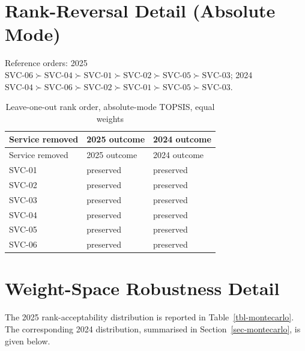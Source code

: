 \documentclass[
  12pt,
  letterpaper,
  12pt,
  oneside,
  english,
  onehalfspacing,
  headsepline]{MastersDoctoralThesis}
\begin{document}
\section{Rank-Reversal Detail (Absolute
Mode)}\label{rank-reversal-detail-absolute-mode}

Reference orders: 2025
\(\text{SVC-06} \succ \text{SVC-04} \succ \text{SVC-01} \succ \text{SVC-02} \succ \text{SVC-05} \succ \text{SVC-03}\);
2024
\(\text{SVC-04} \succ \text{SVC-06} \succ \text{SVC-02} \succ \text{SVC-01} \succ \text{SVC-05} \succ \text{SVC-03}\).

\begin{longtable}[]{@{}lll@{}}
\caption{Leave-one-out rank order, absolute-mode TOPSIS, equal
weights}\label{tbl-appc-rankreversal-abs}\tabularnewline
\toprule\noalign{}
Service removed & 2025 outcome & 2024 outcome \\
\midrule\noalign{}
\endfirsthead
\toprule\noalign{}
Service removed & 2025 outcome & 2024 outcome \\
\midrule\noalign{}
\endhead
\bottomrule\noalign{}
\endlastfoot
SVC-01 & preserved & preserved \\
SVC-02 & preserved & preserved \\
SVC-03 & preserved & preserved \\
SVC-04 & preserved & preserved \\
SVC-05 & preserved & preserved \\
SVC-06 & preserved & preserved \\
\end{longtable}

\section{Weight-Space Robustness
Detail}\label{weight-space-robustness-detail}

The 2025 rank-acceptability distribution is reported in
Table~\ref{tbl-montecarlo}. The corresponding 2024 distribution,
summarised in Section~\ref{sec-montecarlo}, is given below.
\end{document}
